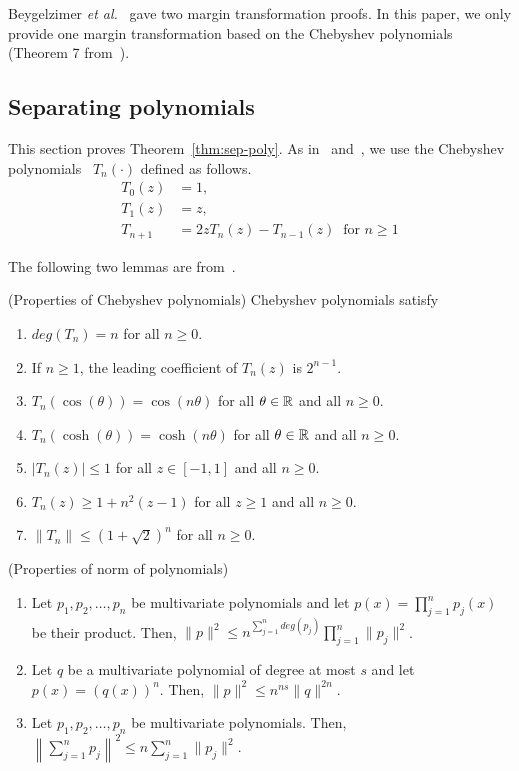   Beygelzimer {\em et al.}~\cite{BeygelzimerPSTWZ2019-separable} gave two margin transformation proofs.  
  In this paper, we only provide one margin transformation based on the Chebyshev polynomials (Theorem 7 from~\cite{BeygelzimerPSTWZ2019-separable}).

\subsection{Separating polynomials}
\label{sect:sep-poly}

This section proves Theorem~\ref{thm:sep-poly}.  As
in~\cite{BeygelzimerPSTWZ2019-separable}
and~\cite{KlivansS2004-halfspaces-margin}, we use the Chebyshev
polynomials~\cite{MasonH2002-chebyshev} $T_n(\cdot)$ defined as
follows.
\begin{align*}
    T_0(z)&=1,\\
    T_1(z)&=z,\\
    T_{n+1}&=2z T_n(z)-T_{n-1}(z) \;\;\text{for $n\geq 1$}
\end{align*}

The following two lemmas are
from~\cite{BeygelzimerPSTWZ2019-separable}.

\begin{lemma}
\label{lem:cheby-prop}
(Properties of Chebyshev polynomials) Chebyshev polynomials satisfy
\begin{enumerate}
    \item $deg(T_n) = n$ for all $n \geq 0$.
    \item If $n \geq 1$, the leading coefficient of $T_n(z)$ is $2^{n-1}$.
    \item $T_n(\cos (\theta)) = \cos (n\theta)$ for all $\theta \in {\mathbb{R}}$ and all $n \geq 0$.
    \item $T_n(\cosh (\theta)) = \cosh (n\theta)$ for all $\theta \in {\mathbb{R}}$ and all $n \geq 0$.
    \item $|T_n(z)| \leq 1$ for all $z \in [-1, 1]$ and all $n \geq 0$.
    \item $T_n(z) \geq 1 + n^2(z - 1)$ for all $z \geq 1$ and all $n \geq 0$.
    \item $\|T_n\| \leq (1+\sqrt{2})^n$ for all $n \geq 0$.
\end{enumerate}
\end{lemma}

\begin{lemma}
\label{lem:poly-prop}
(Properties of norm of polynomials) 
\begin{enumerate}
    \item Let $p_1,p_2,\ldots,p_n$ be multivariate polynomials and let $p(x)=\prod_{j=1}^n p_j(x)$
    be their product. Then, $\|p\|^2\leq n^{\sum_{j=1}^n deg(p_j)}\prod_{j=1}^n \|p_j\|^2$.
    \item Let $q$ be a multivariate polynomial of degree at most $s$ and let $p(x)=(q(x))^n$. Then,
    $\|p\|^2\leq n^{ns}\|q\|^{2n}$.
    \item Let $p_1,p_2,\ldots,p_n$ be multivariate polynomials. Then, 
    $\left\|\sum_{j=1}^n p_j\right\|^2 \leq n\sum_{j=1}^n \|p_j\|^2.$
\end{enumerate}
\end{lemma}